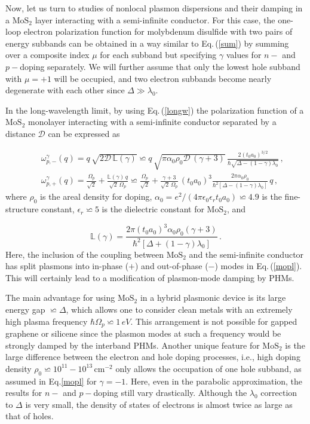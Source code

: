 \documentclass[aps,prb,showpacs]{revtex4}
\newcommand{\mbb}{\mathbb}
\begin{document}
Now, let us turn to studies of nonlocal plasmon dispersions and their damping in a $\mathrm{MoS}_2$ layer interacting with a semi-infinite conductor. For this case, 
the one-loop electron polarization function for molybdenum disulfide with two pairs of energy subbands can be obtained in a way similar to Eq.\,(\ref{sum})
by summing over a composite index $\mu$ for each subband but specifying $\gamma$ values for $n-$ and $p-$doping separately.
We will further assume that only the lowest hole subband with $\mu=+1$ will be occupied, and two electron subbands become nearly degenerate with each other since $\Delta\gg\lambda_0$.
\medskip

In the long-wavelength limit, by using Eq.\,(\ref{longw}) the polarization function of a $\mathrm{MoS}_2$ monolayer interacting with a semi-infinite 
conductor separated by a distance $\mathcal{D}$ can be expressed as 

\begin{eqnarray}
\nonumber
&& \omega^\gamma_{p,-}(q) = q\,\sqrt{2 \mathcal{D} \, \mbb{L}(\gamma)} \backsimeq q\, \sqrt{\pi\alpha_0 \rho_0 \mathcal{D} \, (\gamma+3)} \,  \frac{2(t_0 a_0)^{3/2}}{\hbar\sqrt{\Delta - 
(1 - \gamma) \lambda_0}}\, ,\\
&& \omega^\gamma_{p,+}(q) = \frac{\Omega_p}{\sqrt{2}} + \frac{\mbb{L}(\gamma)\,q}{\sqrt{2}\, \Omega_p} \backsimeq \frac{\Omega_p}{\sqrt{2}} + 
\frac{\gamma+3}{\sqrt{2}\, \Omega_p}\, (t_0a_0)^3 \frac{2\pi \alpha_0 \rho_0}{\hbar^2\left[\Delta - (1 - \gamma) \lambda_0 \right]} \,q \, ,
\label{mopl}
\end{eqnarray}
where $\rho_0$ is the areal density for doping,
$\alpha_0 = e^2/(4\pi\epsilon_0\epsilon_rt_0a_0)\backsimeq 4.9$ is the fine-structure constant,
$\epsilon_r\backsimeq 5$ is the dielectric constant for $\mathrm{MoS}_2$, and

\begin{equation}
\mbb{L}(\gamma)=\frac{2\pi(t_0a_0)^3\alpha_0 \rho_0(\gamma+3)}{\hbar^2[\Delta+(1-\gamma)\lambda_0]}\, .
\end{equation}
Here, the inclusion of the coupling between $\mathrm{MoS}_2$ and the semi-infinite conductor has split plasmons into in-phase ($+$) and out-of-phase ($-$) modes in Eq.\,(\ref{mopl}).  
This will certainly lead to a modification of plasmon-mode damping by PHMs.
\medskip

The main advantage for using $\mathrm{MoS}_2$ in a hybrid plasmonic device is its large energy gap $\backsimeq \Delta$, which allows one
to consider clean metals with an extremely high plasma frequency $\hbar \Omega_p \backsimeq 1\,eV$. This arrangement is not 
possible for gapped graphene or silicene since
the plasmon modes at such a frequency would be strongly damped by the interband PHMs. Another unique feature for $\mathrm{MoS}_2$ is the large difference between the 
electron and hole doping processes, i.e., high doping density $\rho_0 \backsimeq 10^{11}-10^{13}\,$cm$^{-2}$ only allows the occupation of one hole subband, as assumed in Eq.\eqref{mopl} for $\gamma=-1$. 
Here, even in the parabolic approximation, the results for $n-$ and $p-$doping still vary drastically. Although the $\lambda_0$ 
correction to $\Delta$ is very small, the density of states of electrons is almost twice as large as that of holes. 
\medskip
\end{document}

